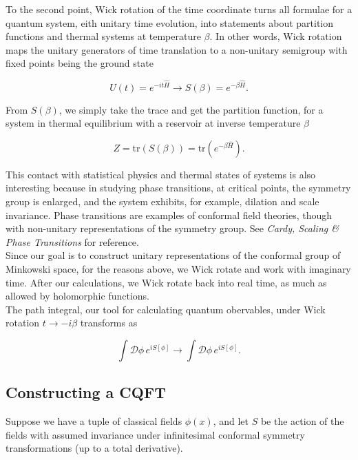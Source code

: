 \noindent To the second point, Wick rotation of the time coordinate turns all formulae for a quantum system, eith unitary time evolution, into statements about partition functions and thermal systems at temperature $\beta$. In other words, Wick rotation maps the unitary generators of time translation to a non-unitary semigroup with fixed points being the ground state

\begin{equation}
U(t) = e^{-it\hat{H}} \rightarrow S(\beta) = e^{-\beta \hat{H}}.
\end{equation}

\noindent From $S(\beta)$, we simply take the trace and get the partition function, for a system in thermal equilibrium with a reservoir at inverse temperature $\beta$

\begin{equation}
Z = \text{tr} (S(\beta)) = \text{tr} (e^{-\beta \hat{H}}).
\end{equation}

\noindent This contact with statistical physics and thermal states of systems is also interesting because in studying phase transitions, at critical points, the symmetry group is enlarged, and the system exhibits, for example, dilation and scale invariance. Phase transitions are examples of conformal field theories, though with non-unitary representations of the symmetry group. See \textit{Cardy, Scaling \& Phase Transitions} for reference. \\

\noindent Since our goal is to construct unitary representations of the conformal group of Minkowski space, for the reasons above, we Wick rotate and work with imaginary time. After our calculations, we Wick rotate back into real time, as much as allowed by holomorphic functions. \\

\noindent The path integral, our tool for calculating quantum obervables, under Wick rotation $t \rightarrow -i \beta$ transforms as 

\begin{equation}
\int \mathcal{D} \phi \, e^{i S[\phi]} \rightarrow \int \mathcal{D} \phi \, e^{iS[\phi]}.
\end{equation}

\subsection*{Constructing a CQFT}

\noindent Suppose we have a tuple of classical fields $\phi(x)$, and let $S$ be the action of the fields with assumed invariance under infinitesimal conformal symmetry transformations (up to a total derivative).

